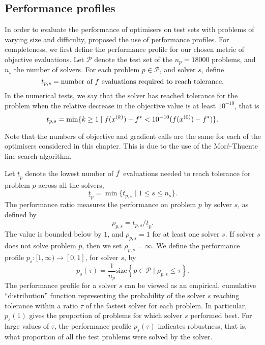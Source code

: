 \documentclass[main.tex]{subfiles}
\begin{document}
\subsection{Performance profiles}\label{subsec:perf_prof}
In order to evaluate the performance of optimisers on test sets with
problems of varying size and difficulty, \citet{dolan2002benchmarking}
proposed the use of performance profiles.  For completeness, we first
define the performance profile for our chosen metric of objective
evaluations.  Let $\mathcal{P}$ denote the test set of the
$n_p=\num{18000}$ problems, and $n_s$ the number of solvers.  For each
problem $p\in\mathcal{P}$, and solver $s$, define
\begin{equation}
  t_{p,s} = \text{number of $f$ evaluations required to reach
    tolerance.}
\end{equation}
In the numerical tests, we say that the solver has reached tolerance
for the problem when the relative decrease in the objective value is
at least $10^{-10}$, that is
\begin{equation}\label{eq:def_performance_measure}
  t_{p,s} = \min\{k\geq 1 \mid f(x^{(k)})-f^* < 10^{-10}(f(x^{(0)})-f^*)\}.
\end{equation}
\begin{remark}
  Note that the numbers of objective and gradient calls are the same
  for each of the optimisers considered in this chapter. This is
  due to the use of the Mor\'{e}-Thuente line search algorithm.
\end{remark}

Let $\underline{t}_p$ denote the lowest number of $f$ evaluations
needed to reach tolerance for problem $p$ across all the solvers,
\begin{equation}
  \underline{t}_p=\min\{t_{p,s}\mid 1\leq s\leq n_s\}.
\end{equation}
The performance ratio measures the performance on problem $p$ by
solver $s$, as defined by
\begin{equation}
  \rho_{p,s}=t_{p,s}/\underline{t}_p.
\end{equation}
The value is bounded below by $1$, and $\rho_{p,s}=1$ for at least one
solver $s$.  If solver $s$ does not solve problem $p$, then we set
$\rho_{p,s}=\infty$.  We define the performance profile
$p_s:[1,\infty)\to[0,1]$, for solver $s$, by
\begin{equation}\label{eq:perf_profile}
  p_s(\tau) = \frac{1}{n_p}\mbox{size}\left\{p\in\mathcal{P}\mid \rho_{p,s}\leq \tau\right\}.
\end{equation}
The performance profile for a solver $s$ can be viewed as an
empirical, cumulative ``distribution'' function representing the
probability of the solver $s$ reaching tolerance within a ratio $\tau$
of the fastest solver for each problem.  In particular, $p_s(1)$ gives
the proportion of problems for which solver $s$ performed best. For
large values of $\tau$, the performance profile $p_s(\tau)$ indicates
robustness, that is, what proportion of all the test problems were
solved by the solver.
\end{document}
